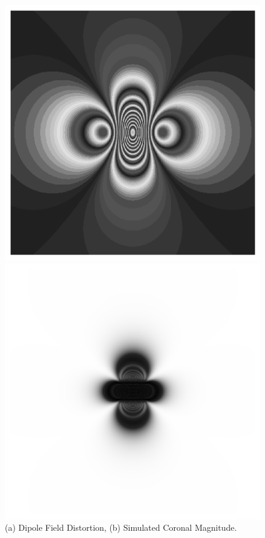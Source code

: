 \documentclass[conference]{IEEEtran}
\begin{document}
\begin{figure}[h]
    \centering
    \begin{minipage}{0.241\textwidth}
        \centering
        \includegraphics[width=\textwidth, angle=90]{Conference/img/dipole-field-distortion.png}
    \end{minipage}\hfill \hspace*{0cm}
    \begin{minipage}{0.241\textwidth}
        \centering
        \includegraphics[width=\textwidth]{Conference/img/coronal-magnitude-simulation.png}
    \end{minipage}\hfill \hspace*{0cm}
    \caption{(a) Dipole Field Distortion,
    (b) Simulated Coronal Magnitude.}
    \label{fig:simulations}
\end{figure}
\end{document}

